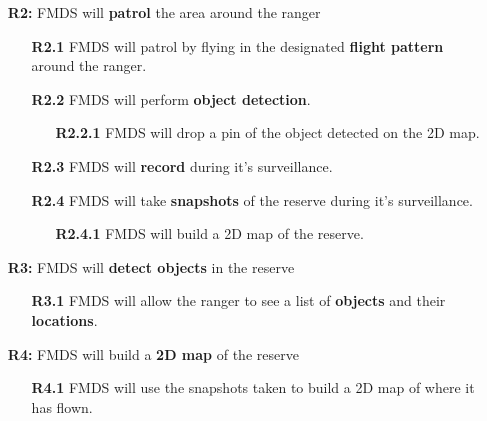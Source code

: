 \begin{itemize}
    \item [\textbf{R2:}] FMDS will \textbf{patrol} the area around the ranger
    
    \begin{itemize}
        \item [\textbf{R2.1}] FMDS will patrol by flying in the designated \textbf{flight pattern} around the ranger.
        \item [\textbf{R2.2}] FMDS will perform \textbf{object detection}.
            \begin{itemize}
                \item [\textbf{R2.2.1}] FMDS will drop a pin of the object detected on the 2D map.
            \end{itemize}
        \item [\textbf{R2.3}] FMDS will \textbf{record} during it's surveillance.
        \item [\textbf{R2.4}] FMDS will take \textbf{snapshots} of the reserve during it's surveillance.
            \begin{itemize}
                \item [\textbf{R2.4.1}] FMDS will build a 2D map of the reserve.
            \end{itemize}
    \end{itemize}
\end{itemize}

\begin{itemize}
    \item  [\textbf{R3:}] FMDS will \textbf{detect objects} in the reserve

    \begin{itemize}
        \item  [\textbf{R3.1}] FMDS will allow the ranger to see a list of \textbf{objects} and their \textbf{locations}.
    \end{itemize}
\end{itemize}

\begin{itemize}
    \item  [\textbf{R4:}] FMDS will build a \textbf{2D map} of the reserve

    \begin{itemize}
        \item  [\textbf{R4.1}] FMDS will use the snapshots taken to build a 2D map of where it has flown.
    \end{itemize}
\end{itemize}